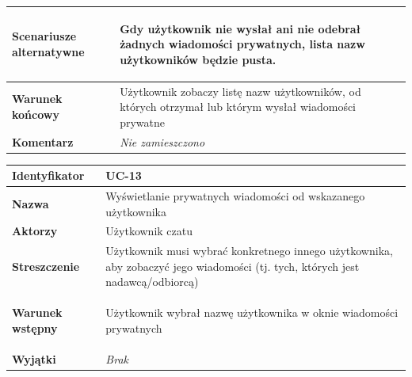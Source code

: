 {\begin{tabular}{ | l | l | }
	\hline
		\parbox[t]{4cm}{\textbf{Scenariusze alternatywne}} & \parbox[t]
		{11cm}{
			\begin{enumreq}
				\item Gdy użytkownik nie wysłał ani nie odebrał żadnych
				wiadomości prywatnych, lista nazw użytkowników będzie pusta.
			\end{enumreq}
		}
		\\
		
	\hline
		\parbox[t]{4cm}{\textbf{Warunek końcowy}} & \parbox[t]{11cm}{
			Użytkownik zobaczy listę nazw użytkowników, od których
			otrzymał lub którym wysłał wiadomości prywatne
		}
		\\
		
	\hline
		\parbox[t]{4cm}{\textbf{Komentarz}} & \parbox[t]{11cm}{
			\textit{Nie zamieszczono}
		}
		\\

	\hline
\end{tabular}

\vspace{2em}

\begin{tabular}{ | l | l | }
	\hline
		\textbf{Identyfikator} & 
		UC-13
		\\
		
	\hline
		\textbf{Nazwa} & 
		Wyświetlanie prywatnych wiadomości od wskazanego użytkownika
		\\
		
	\hline
		\textbf{Aktorzy} & \parbox[t]{11cm}{
			Użytkownik czatu
		}\\
		 
	\hline
		\parbox[t]{4cm}{\textbf{Streszczenie}} & \parbox[t]{11cm}{
			Użytkownik musi wybrać konkretnego innego użytkownika,
			aby zobaczyć jego wiadomości (tj. tych, których jest
			nadawcą/odbiorcą)
			
		}\\
		
	\hline
		\parbox[t]{4cm}{\textbf{Warunek wstępny}} & \parbox[t]{11cm}{
			\begin{enumreq}
				\item Użytkownik wybrał nazwę użytkownika w oknie wiadomości
				 prywatnych
			\end{enumreq}
				
		}
		\\
		
	\hline
		\parbox[t]{4cm}{\textbf{Wyjątki}} & \parbox[t]{11cm}{
			\textit{Brak}
			
		}
		\\


\end{tabular}}
